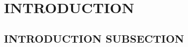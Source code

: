 \documentclass[../main/main.tex]{subfiles}
\begin{document}
\section{INTRODUCTION}

\subsection{INTRODUCTION SUBSECTION}
\end{document}
